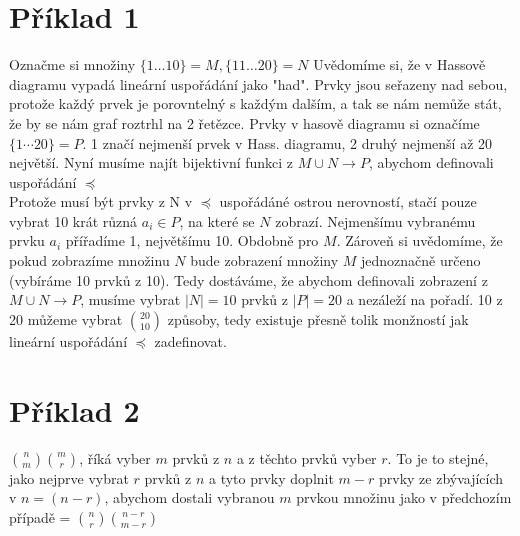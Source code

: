 \documentclass[a4paper]{article}
\author{Hynek Kydlicek}
\title{}
\begin{document}
\maketitle
\section{Příklad 1}
Označme si množiny $\{1\ldots 10\} = M, \{11 \ldots 20\} = N$
Uvědomíme si, že v Hassově diagramu vypadá lineární uspořádání jako "had". Prvky jsou seřazeny nad sebou, protože každý prvek je porovntelný s každým dalším, a tak se nám nemůže stát, že by se nám graf roztrhl na 2 řetězce.
Prvky v hasově diagramu si označíme $\{1\cdots20\} = P$. 1 značí nejmenší prvek v Hass. diagramu, 2 druhý nejmenší až 20 největší.
Nyní musíme najít bijektivní funkci z $M\cup N \to  P$, abychom definovali uspořádání $\preceq$
\\
Protože musí být prvky z N v $\preceq$ uspořádáné ostrou nerovností, stačí pouze vybrat 10 krát různá $a_i \in P$, na které se $N$ zobrazí.
Nejmenšímu vybranému prvku $a_i$ přířadíme 1, největšímu 10. Obdobně pro $M$.
Zároveň si uvědomíme, že pokud zobrazíme množinu $N$ bude zobrazení množiny $M$ jednoznačně určeno (vybíráme 10 prvků z 10).
Tedy dostáváme, že abychom definovali zobrazení z $M \cup N \to  P$, musíme vybrat $|N| =10$ prvků z $|P| = 20$ a nezáleží na pořadí. 10 z 20 můžeme vybrat $\binom{20}{10}$ způsoby, tedy existuje přesně tolik monžností jak lineární uspořádání $\preceq$ zadefinovat.

\section{Příklad 2}
$\binom{n}{m}\binom{m}{r}$, říká vyber $m$ prvků z $n$ a z těchto prvků vyber $r$. To je to stejné, jako nejprve vybrat $r$ prvků z $n$ a tyto prvky doplnit $m-r$ prvky ze zbývajících v $n = (n-r)$, abychom dostali vybranou $m$ prvkou množinu jako v předchozím případě = $\binom{n}{r}\binom{n-r}{m-r}$
\end{document}
